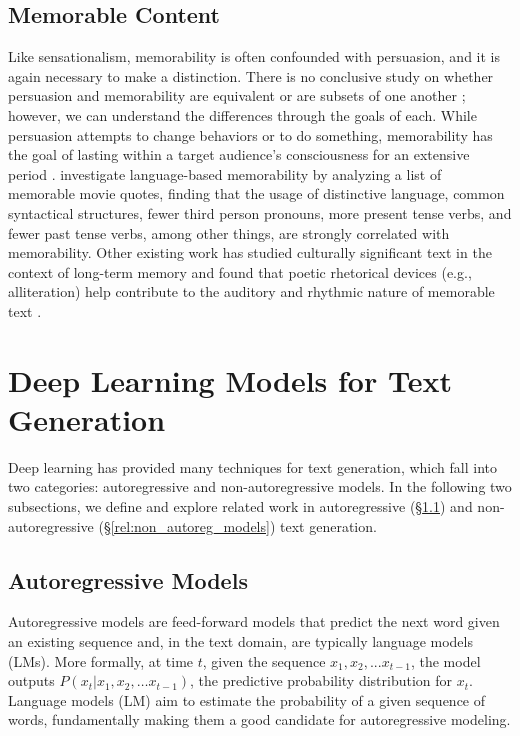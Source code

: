 \subsection{Memorable Content}
\label{rel:mem}
Like sensationalism, memorability is often confounded with persuasion, and it is again necessary to make a distinction. There is no conclusive study on whether persuasion and memorability are equivalent or are subsets of one another \citep{goode2007implicit}; however, we can understand the differences through the goals of each. While persuasion attempts to change behaviors or to do something, memorability has the goal of lasting within a target audience's consciousness for an extensive period \citep{danescu-niculescu-mizil-etal-2012-hello}. \citet{danescu-niculescu-mizil-etal-2012-hello} investigate language-based memorability by analyzing a list of memorable movie quotes, finding that the usage of distinctive language, common syntactical structures, fewer third person pronouns, more present tense verbs, and fewer past tense verbs, among other things, are strongly correlated with memorability. Other existing work has studied culturally significant text in the context of long-term memory and found that poetic rhetorical devices (e.g., alliteration) help contribute to the auditory and rhythmic nature of memorable text \citep{rubin1977very, hyman1990memorabeatlia, boers2005finding}.

\section{Deep Learning Models for Text Generation}
\label{rel:nlg}

Deep learning has provided many techniques for text generation, which fall into two categories: autoregressive and non-autoregressive models. In the following two subsections, we define and explore related work in autoregressive (\S\ref{rel:autoreg_models}) and non-autoregressive (\S\ref{rel:non_autoreg_models}) text generation.

\subsection{Autoregressive Models}
\label{rel:autoreg_models}

Autoregressive models are feed-forward models that predict the next word given an existing sequence and, in the text domain, are typically language models (LMs). More formally, at time $t$, given the sequence $x_1, x_2, ... x_{t-1}$, the model outputs $P(x_t | x_1, x_2, \dots x_{t-1})$, the predictive probability distribution for $x_t$. Language models (LM) aim to estimate the probability of a given sequence of words, fundamentally making them a good candidate for autoregressive modeling. 

